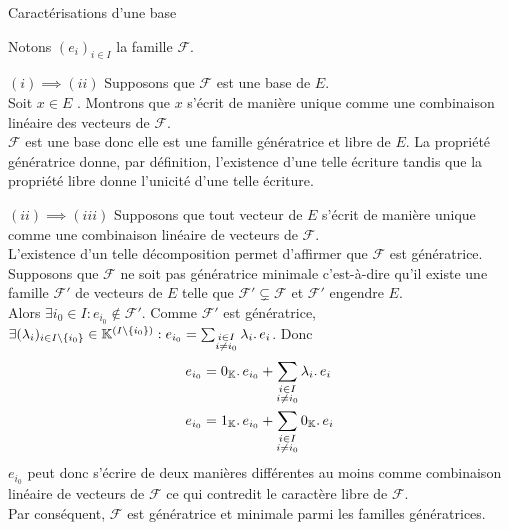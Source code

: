 \documentclass{article}
\renewenvironment{question_kholle}[2][ ]
{
	\subsection{\texorpdfstring{#2}{}}
	\notblank{#1}
	{
		\noindent #1
		\bigbreak
	}
	{}
	\begin{proof}
}
{
	\end{proof}
}
\begin{document}
	\begin{question_kholle}
		{Caractérisations d'une base}

		Notons $(e_i)_{i \in I}$ la famille $\mathcal{F}$.


		$(i) \implies (ii)$ Supposons que $\mathcal{F}$ est une base de $E$. \\
		Soit $x \in E$ \fq. Montrons que $x$ s'écrit de manière unique comme une combinaison linéaire des vecteurs de $\mathcal{F}$. \\
		$\mathcal{F}$ est une base donc elle est une famille génératrice et libre de $E$. La propriété génératrice donne, par définition, l'existence d'une telle écriture tandis que la propriété libre donne l'unicité d'une telle écriture.

		$(ii) \implies (iii)$ Supposons que tout vecteur de $E$ s'écrit de manière unique comme une combinaison linéaire de vecteurs de $\mathcal{F}$. \\
		L'existence d'un telle décomposition permet d'affirmer que $\mathcal{F}$ est génératrice. \\
		Supposons que $\mathcal{F}$ ne soit pas génératrice minimale c'est-à-dire qu'il existe une famille $\mathcal{F}'$ de vecteurs de $E$ telle que $\mathcal{F}' \subsetneq \mathcal{F}$ et $\mathcal{F}'$ engendre $E$. \\
		Alors $\exists i_0 \in I : e_{i_0} \notin \mathcal{F}'$. Comme $\mathcal{F}'$ est génératrice, $\exists (\lambda_i)_{i \in I \setminus \{i_0\}} \in \mathbb K^{(I \setminus \{i_0\})} : e_{i_0} = \sum_{\substack{i \in I \\ i \neq i_0}} \lambda_i \ldotp e_i$.
		Donc \begin{equation*}
			\begin{aligned}
				e_{i_0} &= 0_{\mathbb K} \ldotp e_{i_0} + \sum_{\substack{i \in I \\ i \neq i_0}} \lambda_i \ldotp e_i \\
				e_{i_0} &= 1_{\mathbb K} \ldotp e_{i_0} + \sum_{\substack{i \in I \\ i \neq i_0}} 0_{\mathbb K} \ldotp e_i
			\end{aligned}
		\end{equation*}
		$e_{i_0}$ peut donc s'écrire de deux manières différentes au moins comme combinaison linéaire de vecteurs de $\mathcal{F}$ ce qui contredit le caractère libre de $\mathcal{F}$. \\
		Par conséquent, $\mathcal{F}$ est génératrice et minimale parmi les familles génératrices.


\end{question_kholle}
\end{document}
